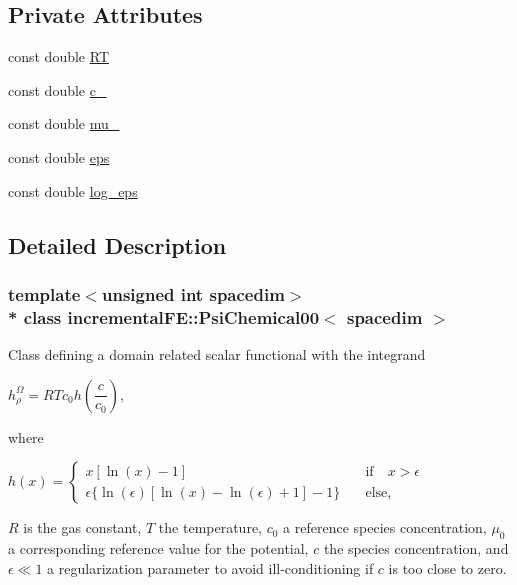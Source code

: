 \subsection*{Private Attributes}
\begin{DoxyCompactItemize}
\item 
const double \hyperlink{classincremental_f_e_1_1_psi_chemical00_ad2500e079225b055e821ecc9e4baf3b6}{RT}
\item 
const double \hyperlink{classincremental_f_e_1_1_psi_chemical00_a2ad0343d949c11ca7ce23618939a623b}{c\+\_}
\item 
const double \hyperlink{classincremental_f_e_1_1_psi_chemical00_a3c264a3e33072def54f2376ee9a0b4ea}{mu\+\_}
\item 
const double \hyperlink{classincremental_f_e_1_1_psi_chemical00_a8016f9e379c596ca0ed60479110a3178}{eps}
\item 
const double \hyperlink{classincremental_f_e_1_1_psi_chemical00_a0288b7812d0350e1f38f740c010b9600}{log\+\_\+eps}
\end{DoxyCompactItemize}


\subsection{Detailed Description}
\subsubsection*{template$<$unsigned int spacedim$>$\\*
class incremental\+F\+E\+::\+Psi\+Chemical00$<$ spacedim $>$}

Class defining a domain related scalar functional with the integrand

$h^\Omega_\rho = RT c_0 h\left( \dfrac{c}{c_0} \right)$,

where

$ h(x) = \begin{cases} x [ \ln(x)-1] \quad&\mathrm{if}\quad x>\epsilon\\ \epsilon \{ \ln(\epsilon) [ \ln(x) - \ln(\epsilon) + 1] - 1\} \quad&\mathrm{else}, \end{cases} $

$R$ is the gas constant, $T$ the temperature, $c_0$ a reference species concentration, $\mu_0$ a corresponding reference value for the potential, $c$ the species concentration, and $\epsilon \ll 1$ a regularization parameter to avoid ill-\/conditioning if $c$ is too close to zero.

